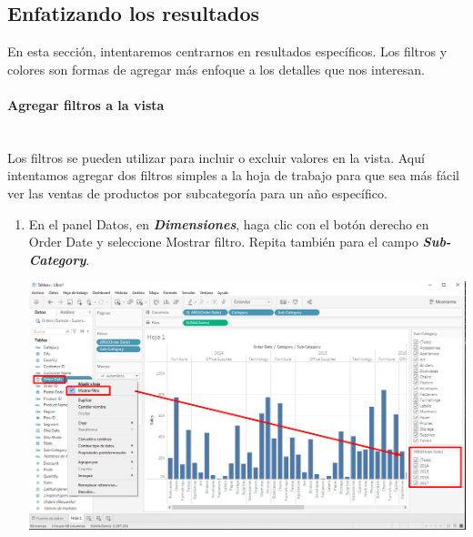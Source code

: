 \documentclass[12pt,letterpaper]{article}
\begin{document}
    \subsection{Enfatizando los resultados}
    En esta sección, intentaremos centrarnos en resultados específicos. Los filtros y colores son formas de agregar más enfoque a los detalles que nos interesan.
    \paragraph{\large Agregar filtros a la vista\\ \\}
    Los filtros se pueden utilizar para incluir o excluir valores en la vista. Aquí intentamos agregar dos filtros simples a la hoja de trabajo para que sea más fácil ver las ventas de productos por subcategoría para un año específico.
    \begin{enumerate}
        \item En el panel Datos, en \textit{\textbf{Dimensiones}}, haga clic con el botón derecho en Order Date y seleccione Mostrar filtro. Repita también para el campo \textit{\textbf{Sub-Category}}.
        \begin{center}
            \includegraphics[width=15cm]{./img/img19.png}
        \end{center}
    \end{enumerate}
\end{document}
